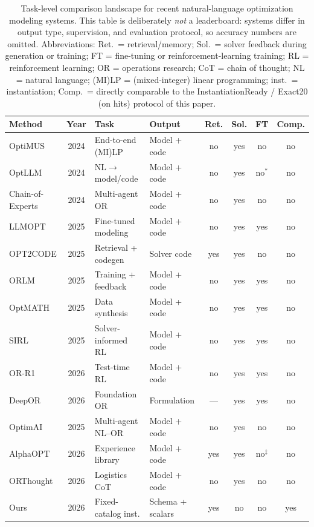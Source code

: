 \documentclass[pdflatex,sn-basic,Numbered]{sn-jnl}
\renewcommand{\arraystretch}{1.18}
\begin{document}
\begin{table}[htbp]
\centering
\caption{Task-level comparison landscape for recent natural-language optimization modeling systems.
This table is deliberately \emph{not} a leaderboard: systems differ in output type, supervision, and
evaluation protocol, so accuracy numbers are omitted. Abbreviations: Ret.\ = retrieval/memory;
Sol.\ = solver feedback during generation or training; FT = fine-tuning or reinforcement-learning training; RL = reinforcement learning; OR = operations research; CoT = chain of thought; NL = natural language; (MI)LP = (mixed-integer) linear programming;
inst.\ = instantiation; Comp.\ = directly comparable
to the InstantiationReady / Exact20 (on hits) protocol of this paper.}
\label{tab:comparison_landscape}
\small
\setlength{\tabcolsep}{2.4pt}
\renewcommand{\arraystretch}{1.12}
\begin{tabularx}{\linewidth}{@{}>{\raggedright\arraybackslash}p{2.6cm}c>{\raggedright\arraybackslash}p{2.6cm}Xcccc@{}}
\toprule
Method & Year & Task & Output & Ret. & Sol. & FT & Comp. \\
\midrule
OptiMUS & 2024 & End-to-end (MI)LP & Model + code & no & yes & no & no \\
OptLLM & 2024 & NL$\rightarrow$model/code & Model + code & no & yes & no$^{*}$ & no \\
Chain-of-Experts & 2024 & Multi-agent OR & Model + code & no & yes & no & no \\
LLMOPT & 2025 & Fine-tuned modeling & Model + code & no & yes & yes & no \\
OPT2CODE & 2025 & Retrieval + codegen & Solver code & yes & yes & no & no \\
ORLM & 2025 & Training + feedback & Model + code & no & yes & yes & no \\
OptMATH & 2025 & Data synthesis & Model + code & no & yes & yes & no \\
SIRL & 2025 & Solver-informed RL & Model + code & no & yes & yes & no \\
OR-R1 & 2026 & Test-time RL & Model + code & no & yes & yes & no \\
DeepOR & 2026 & Foundation OR & Formulation & --- & yes & yes & no \\
OptimAI & 2025 & Multi-agent NL--OR & Model + code & no & yes & no & no \\
AlphaOPT & 2026 & Experience library & Model + code & yes & yes & no$^{\ddagger}$ & no \\
ORThought & 2026 & Logistics CoT & Model + code & no & yes & no & no \\
Ours & 2026 & Fixed-catalog inst. & Schema + scalars & yes & no & no & yes \\
\bottomrule
\end{tabularx}


\end{table}
\end{document}
